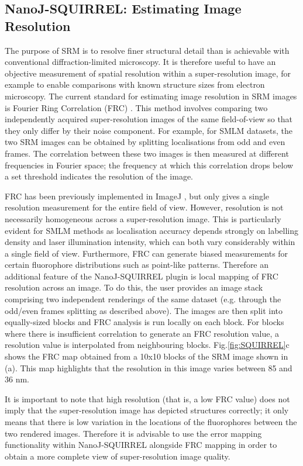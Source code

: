 \subsection*{NanoJ-SQUIRREL: Estimating Image Resolution}
 The purpose of SRM is to resolve finer structural detail than is achievable with conventional diffraction-limited microscopy. It is therefore useful to have an objective measurement of spatial resolution within a super-resolution image, for example to enable comparisons with known structure sizes from electron microscopy. The current standard for estimating image resolution in SRM images is Fourier Ring Correlation (FRC) \cite{nieuwenhuizen2013measuring}. This method involves comparing two independently acquired super-resolution images of the same field-of-view so that they only differ by their noise component. For example, for SMLM datasets, the two SRM images can be obtained by splitting localisations from odd and even frames. The correlation between these two images is then measured at different frequencies in Fourier space; the frequency at which this correlation drops below a set threshold indicates the resolution of the image.

 FRC has been previously implemented in ImageJ \cite{nieuwenhuizen2013measuring}, but only gives a single resolution measurement for the entire field of view. However, resolution is not necessarily homogeneous across a super-resolution image. This is particularly evident for SMLM methods as localisation accuracy depends strongly on labelling density and laser illumination intensity, which can both vary considerably within a single field of view. Furthermore, FRC can generate biased measurements for certain fluorophore distributions such as point-like patterns. Therefore an additional feature of the NanoJ-SQUIRREL plugin is local mapping of FRC resolution across an image. To do this, the user provides an image stack comprising two independent renderings of the same dataset (e.g. through the odd/even frames splitting as described above). The images are then split into equally-sized blocks and FRC analysis is run locally on each block. For blocks where there is insufficient correlation to generate an FRC resolution value, a resolution value is interpolated from neighbouring blocks. Fig.\ref{fig:SQUIRREL}c shows the FRC map obtained from a 10x10 blocks of the SRM image shown in (a). This map highlights that the resolution in this image varies between 85 and 36 nm.

 It is important to note that high resolution (that is, a low FRC value) does not imply that the super-resolution image has depicted structures correctly; it only means that there is low variation in the locations of the fluorophores between the two rendered images. Therefore it is advisable to use the error mapping functionality within NanoJ-SQUIRREL alongside FRC mapping in order to obtain a more complete view of super-resolution image quality.

